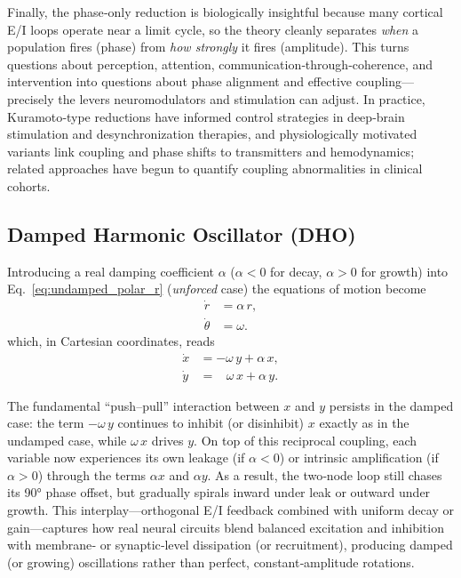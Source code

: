 \documentclass[12pt]{article}
\numberwithin{equation}{section}
\begin{document}
Finally, the phase‑only reduction is biologically insightful because many cortical E/I loops operate near a limit cycle, so the theory cleanly separates \emph{when} a population fires (phase) from \emph{how strongly} it fires (amplitude). This turns questions about perception, attention, communication‑through‑coherence\cite{fries_rhythms_2015}, and intervention into questions about phase alignment and effective coupling—precisely the levers neuromodulators and stimulation can adjust. In practice, Kuramoto‑type reductions have informed control strategies in deep‑brain stimulation and desynchronization therapies\cite{Tass2003CR,Popovych2018Multisite,Weerasinghe2019DBS,Weerasinghe2021MultiContactDBS}, and physiologically motivated variants link coupling and phase shifts to transmitters and hemodynamics\cite{Sadilek2015MultiplexKuramoto}; related approaches have begun to quantify coupling abnormalities in clinical cohorts\cite{Bauer2022KuramotoMDD}.










\subsection{Damped Harmonic Oscillator (DHO)}
Introducing a real damping coefficient \( \alpha \) (\( \alpha<0 \) for decay, \( \alpha>0 \) for growth) into Eq.~\eqref{eq:undamped_polar_r} 
(\emph{unforced} case) the equations of motion become
\begin{align}
    \dot{r}      &= \alpha\,r,  \label{eq:damped_polar_r}\\
    \dot{\theta} &= \omega.     \label{eq:damped_polar_theta}
\end{align}
\noindent
which, in Cartesian coordinates, reads
\begin{align}
    \dot{x} &= -\omega\,y + \alpha\,x, \label{eq:damped_cart_x}\\
    \dot{y} &=  \;\;\;\omega\,x + \alpha\,y. \label{eq:damped_cart_y}
\end{align}



The fundamental “push–pull” interaction between \(x\) and \(y\) persists in the damped case: the term \(-\omega\,y\) continues to inhibit (or disinhibit) \(x\) exactly as in the undamped case, while \(\omega\,x\) drives \(y\).  On top of this reciprocal coupling, each variable now experiences its own leakage (if \(\alpha <0\)) or intrinsic amplification (if \(\alpha>0\)) through the terms \(\alpha x\) and \(\alpha y\). As a result, the two‐node loop still chases its 90° phase offset, but gradually spirals inward under leak or outward under growth.  This interplay—orthogonal E/I feedback combined with uniform decay or gain—captures how real neural circuits blend balanced excitation and inhibition with membrane‐ or synaptic‐level dissipation (or recruitment), producing damped (or growing) oscillations rather than perfect, constant‐amplitude rotations.  
\end{document}
